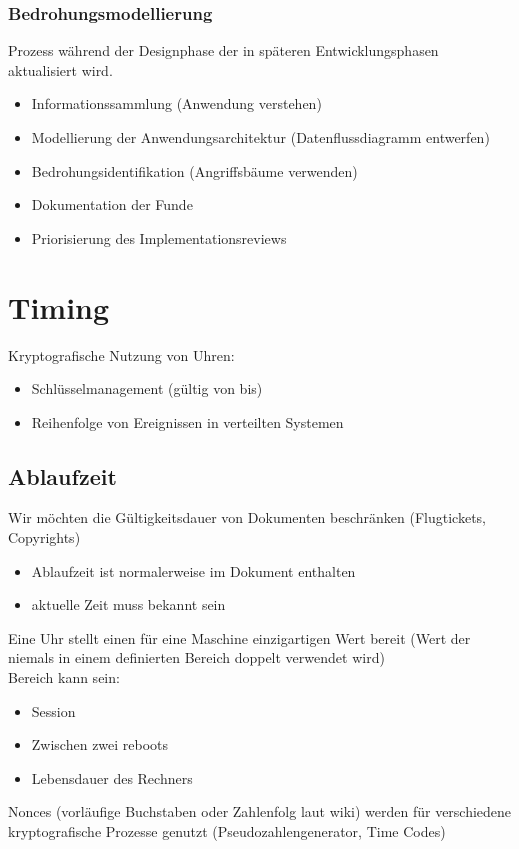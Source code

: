 \documentclass{article} %
\begin{document}
\subsubsection{Bedrohungsmodellierung}
Prozess während der Designphase der in späteren Entwicklungsphasen aktualisiert wird.
\begin{itemize}
	\item Informationssammlung (Anwendung verstehen)
    \item Modellierung der Anwendungsarchitektur (Datenflussdiagramm entwerfen)
    \item Bedrohungsidentifikation (Angriffsbäume verwenden)
    \item Dokumentation der Funde
    \item Priorisierung des Implementationsreviews
\end{itemize}

\section{Timing}
Kryptografische Nutzung von Uhren:
\begin{itemize}
	\item Schlüsselmanagement (gültig von bis)
    \item Reihenfolge von Ereignissen in verteilten Systemen
\end{itemize}
\subsection{Ablaufzeit}
Wir möchten die Gültigkeitsdauer von Dokumenten beschränken (Flugtickets, Copyrights)\\
\begin{itemize}
	\item Ablaufzeit ist normalerweise im Dokument enthalten
    \item aktuelle Zeit muss bekannt sein
\end{itemize}
Eine Uhr stellt einen für eine Maschine einzigartigen Wert bereit (Wert der niemals in einem definierten Bereich doppelt verwendet wird)\\
Bereich kann sein:
\begin{itemize}
	\item Session
    \item Zwischen zwei reboots
    \item Lebensdauer des Rechners
\end{itemize}
Nonces (vorläufige Buchstaben oder Zahlenfolg laut wiki) werden für verschiedene kryptografische Prozesse genutzt (Pseudozahlengenerator, Time Codes)
\end{document}
